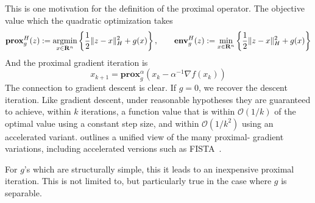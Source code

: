 This is one
motivation for the definition of the proximal operator. The objective
value which the quadratic optimization takes $$
\mathbf{prox}^H_{g}(z):  =\underset{x\in\mathbf{R}^{n}}{\text{argmin}}\left\{
\frac{1}{2}\|z-x\|_H^{2}+g(x)\right\}, \qquad  \mathbf{env}^H_{g}(z):
=\underset{x\in\mathbf{R}^{n}}{\text{min}}\left\{
\frac{1}{2}\|z-x\|_H^{2}+g(x)\right\}  $$ And the proximal gradient
iteration is 
\begin{equation}\label{eq:prox-gradient}
x_{k+1}=\mathbf{prox}^\alpha_g(x_k-\alpha^{-1}\nabla f(x_k))
\end{equation}
The connection to gradient descent is clear. If $g=0$, we recover
the descent iteration. Like gradient descent, under reasonable
hypotheses they are guaranteed to achieve, within $k$ iterations, a
function value that is within $\mathcal{O}(1/k)$ of the optimal value
using a constant step size, and within $\mathcal{O}(1/k^2)$ using an
accelerated variant. \cite{Tseng:2010} outlines a unified view of the
many proximal- gradient variations, including accelerated versions
such as FISTA~\cite{beck2009fast}.

For $g$'s which are structurally simple, this it leads to an
inexpensive proximal iteration. This is not limited to, but
particularly true in the case where $g$ is separable.

